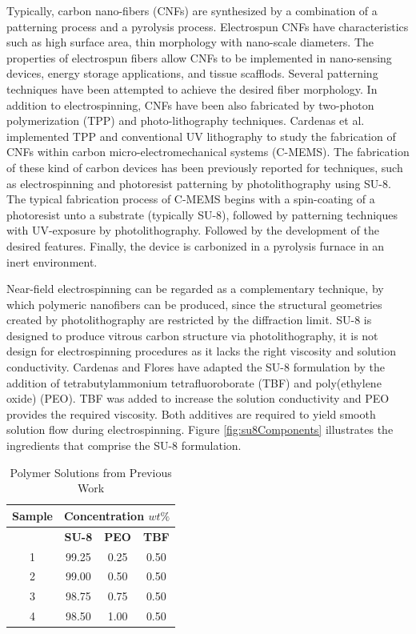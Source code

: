 Typically, carbon nano-fibers (CNFs) are synthesized by a combination of a patterning process and a pyrolysis process. Electrospun CNFs have characteristics such as high surface area, thin morphology with nano-scale diameters. The properties of electrospun fibers allow CNFs to be implemented in nano-sensing devices, energy storage applications, and tissue scafflods. \cite{Khanna2016, Ramakrishna2005, Reneker2000, Norris2000, Vozzi2002, Kim2003, Dersch2005} Several patterning techniques have been attempted to achieve the desired fiber morphology. In addition to electrospinning, CNFs have been also fabricated by two-photon polymerization (TPP) and photo-lithography techniques. \cite{CardenasBenitez2019} Cardenas et al. implemented TPP and conventional UV lithography to study the fabrication of CNFs within carbon micro-electromechanical systems (C-MEMS). The fabrication of these kind of carbon devices has been previously reported for techniques, such as electrospinning and photoresist patterning by photolithography using SU-8. The typical fabrication process of C-MEMS begins with a spin-coating of a photoresist unto a substrate (typically SU-8), followed by patterning techniques with UV-exposure by photolithography. Followed by the development of the desired features. Finally, the device is carbonized in a pyrolysis furnace in an inert environment. \cite{Pramanick2018a}

Near-field electrospinning can be regarded as a complementary technique, by which polymeric nanofibers can be produced, since the structural geometries created by photolithography are restricted by the diffraction limit. \cite{Pramanick2018a, Okazaki1991} SU-8 is designed to produce vitrous carbon structure via photolithography, it is not design for electrospinning procedures as it lacks the right viscosity and solution conductivity. Cardenas \cite{Cardenas2017} and Flores \cite{Flores2017} have adapted the SU-8 formulation by the addition of tetrabutylammonium tetrafluoroborate (TBF) and poly(ethylene oxide) (PEO). TBF was added to increase the solution conductivity and PEO provides the required viscosity. Both additives are required to yield smooth solution flow during electrospinning. Figure \ref{fig:su8Components} illustrates the ingredients that comprise the SU-8 formulation.

\begin{table}[!th]
\centering
\caption[Polymer Solutions from Previous Work]{Polymer Solutions from Previous Work \cite{Cardenas2017, Flores2017}}
\begin{tabular}{cccc}
\hline
\textbf{Sample} & \multicolumn{3}{c}{\textbf{Concentration} $wt\%$} \\
\hline
{} & \textbf{SU-8} & \textbf{PEO} & \textbf{TBF} \\
1  & 99.25         & 0.25         & 0.50         \\
2  & 99.00         & 0.50         & 0.50         \\
3  & 98.75         & 0.75         & 0.50         \\
4  & 98.50         & 1.00         & 0.50         \\
\hline
\end{tabular}
\label{tab:previousPreparedPolymerSolutions}
\end{table}

